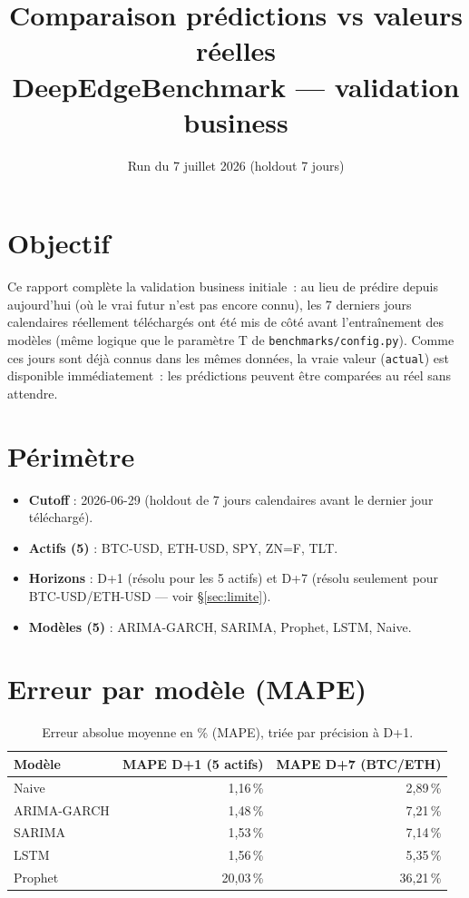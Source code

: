 \documentclass[11pt]{article}
\title{Comparaison pr\'edictions vs valeurs r\'eelles \\ \large DeepEdgeBenchmark --- validation business}
\author{}
\date{Run du 7 juillet 2026 (holdout 7 jours)}
\begin{document}
\maketitle

\section{Objectif}

Ce rapport compl\`ete la validation business initiale~: au lieu de pr\'edire
depuis \guillemotleft{}aujourd'hui\guillemotright{} (o\`u le vrai futur n'est pas encore connu), les 7
derniers jours calendaires r\'eellement t\'el\'echarg\'es ont \'et\'e mis de
c\^ot\'e avant l'entra\^inement des mod\`eles (m\^eme logique que le
param\`etre T de \texttt{benchmarks/config.py}). Comme ces jours sont d\'ej\`a
connus dans les m\^emes donn\'ees, la vraie valeur (\texttt{actual}) est
disponible imm\'ediatement~: les pr\'edictions peuvent \^etre compar\'ees au
r\'eel sans attendre.

\section{P\'erim\`etre}

\begin{itemize}
  \item \textbf{Cutoff} : 2026-06-29 (holdout de 7 jours calendaires avant le
        dernier jour t\'el\'echarg\'e).
  \item \textbf{Actifs (5)} : BTC-USD, ETH-USD, SPY, ZN=F, TLT.
  \item \textbf{Horizons} : D+1 (r\'esolu pour les 5 actifs) et D+7 (r\'esolu
        seulement pour BTC-USD/ETH-USD --- voir \S\ref{sec:limite}).
  \item \textbf{Mod\`eles (5)} : ARIMA-GARCH, SARIMA, Prophet, LSTM, Naive.
\end{itemize}

\section{Erreur par mod\`ele (MAPE)}

\begin{table}[h]
\centering
\begin{tabular}{lrr}
\toprule
Mod\`ele & MAPE D+1 (5 actifs) & MAPE D+7 (BTC/ETH) \\
\midrule
Naive       & 1,16\,\% & 2,89\,\% \\
ARIMA-GARCH & 1,48\,\% & 7,21\,\% \\
SARIMA      & 1,53\,\% & 7,14\,\% \\
LSTM        & 1,56\,\% & 5,35\,\% \\
Prophet     & 20,03\,\% & 36,21\,\% \\
\bottomrule
\end{tabular}
\caption{Erreur absolue moyenne en \% (MAPE), tri\'ee par pr\'ecision \`a D+1.}
\end{table}
\end{document}
